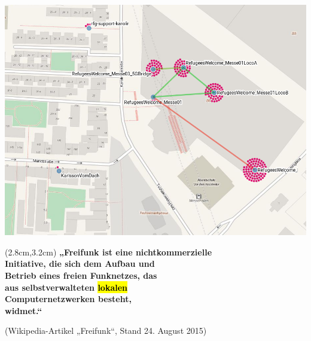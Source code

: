 \documentclass[t]{beamer}
\begin{document}
\begin{frame}{}
    \begin{center}
        \includegraphics[width=.9\textwidth]{Bilder/messe-refugees-welcome}
    \end{center}
\end{frame}




\begin{frame}{}
    \begin{textblock*}{10cm}(2.8cm,3.2cm)
        \Large\bf
        „Freifunk ist eine nicht\-kommerzielle \\
        Initiative, die sich dem Aufbau und \\
        Betrieb eines freien Funknetzes, das \\
        aus selbstverwalteten \hl{\LARGE lokalen} \\
        Computer\-netzwerken besteht, \\
        widmet.“
    \end{textblock*}

    \vspace{7cm}
    \hspace{4.1cm}
    {\scriptsize(Wikipedia-Artikel „Freifunk“, Stand 24. August 2015)}
\end{frame}
\end{document}
